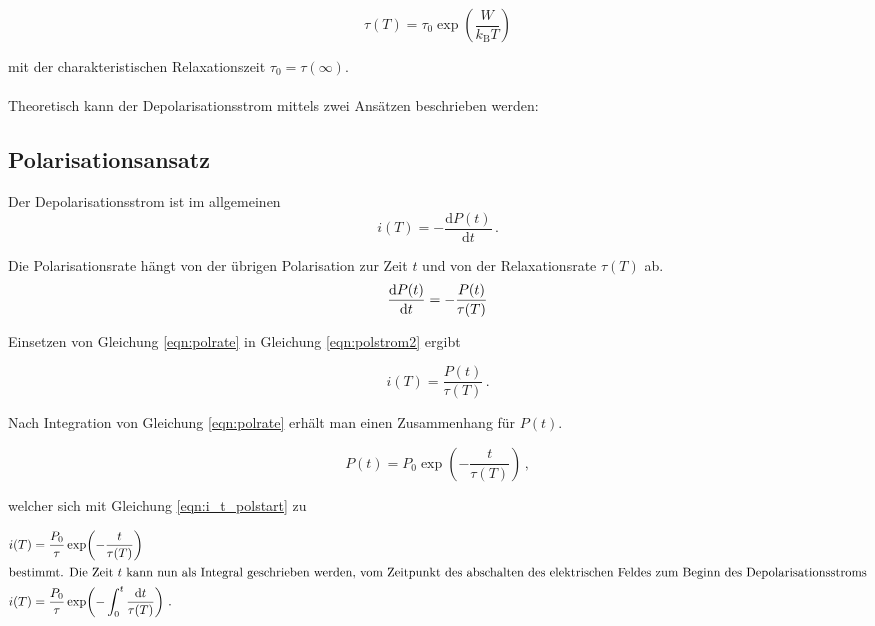 \begin{equation}
    \tau(T) = \tau_0 \exp\!\left(\frac{W}{k_\text{B}T}\right)
    \label{eqn:relax}
\end{equation}

mit der charakteristischen Relaxationszeit $\tau_0 = \tau(\infty)$.
\\~\\
Theoretisch kann der Depolarisationsstrom mittels zwei Ansätzen beschrieben werden:

\subsection{Polarisationsansatz}

Der Depolarisationsstrom ist im allgemeinen
\begin{equation}
    i(T) = -\frac{\mathrm{d}P(t)}{\mathrm{d}t}\,.
    \label{eqn:polstrom2}
\end{equation}

Die Polarisationsrate hängt von der übrigen Polarisation zur Zeit $t$
und von der Relaxationsrate $\tau(T)$ ab.
\begin{equation}
    \frac{\mathinner{\mathrm{d} P(t)}}{\mathinner{\mathrm{d} t}} = -\frac{P(t)}{\tau(T)}
    \label{eqn:polrate}
\end{equation}

Einsetzen von Gleichung \eqref{eqn:polrate} in Gleichung \eqref{eqn:polstrom2} ergibt

\begin{equation}
    i(T) = \frac{P(t)}{\tau(T)}\,.
    \label{eqn:i_t_polstart}
\end{equation}

Nach Integration von Gleichung \eqref{eqn:polrate} erhält man einen Zusammenhang für $P(t)$.

\begin{equation}
    P(t) = P_{0} \exp\!\left(-\frac{t}{\tau(T)}\right)\,,
\end{equation}

welcher sich mit Gleichung \eqref{eqn:i_t_polstart} zu

\begin{align}
    i(T) &= \frac{P_0}{\tau} \exp\!\left(-\frac{t}{\tau(T)}\right) \\
    \intertext{bestimmt. Die Zeit $t$ kann nun als Integral geschrieben werden,
    vom Zeitpunkt des abschalten des elektrischen Feldes zum Beginn des Depolarisationsstroms}
    i(T) &= \frac{P_{0}}{\tau}
    \exp\!\left(-\int_0^t \frac{\mathinner{\mathrm{d} t}}{\tau(T)}\right)\,. \\
\end{align}

